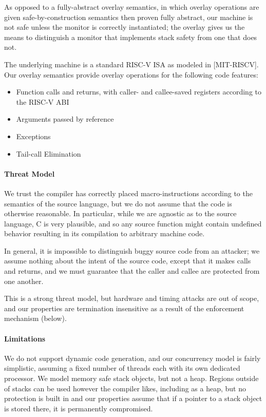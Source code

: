 \documentclass[10pt,conference]{ieeetran}%
\theoremstyle{definition}
\begin{document}
As opposed to a fully-abstract overlay semantics, in which overlay operations
are given safe-by-construction semantics then proven fully abstract,
our machine is not safe unless the monitor is correctly instantiated;
the overlay gives us the means to distinguish a monitor that implements
stack safety from one that does not.

The underlying machine is a standard RISC-V ISA as modeled in [MIT-RISCV].
Our overlay semantics provide overlay operations for the following code features:
\begin{itemize}
\item Function calls and returns, with caller- and callee-saved registers according
  to the RISC-V ABI
\item Arguments passed by reference
\item Exceptions
\item Tail-call Elimination
\end{itemize}

\paragraph*{Threat Model}

We trust the compiler has correctly placed macro-instructions according to
the semantics of the source language, but we do not assume that the code
is otherwise reasonable. In particular, while we are agnostic as to the source
language, C is very plausible, and so any source function might contain undefined
behavior resulting in its compilation to arbitrary machine code.

In general, it is impossible to distinguish buggy source code from an attacker;
we assume nothing about the intent of the source code, except that it makes calls
and returns, and we must guarantee that the caller and callee are protected from one
another.

This is a strong threat model, but hardware and timing attacks are out of scope,
and our properties are termination insensitive as a result of the enforcement mechanism
(below).

\paragraph*{Limitations}

We do not support dynamic code generation, and our concurrency model is fairly
simplistic, assuming a fixed number of threads each with its own dedicated processor.
We model memory safe stack objects, but not a heap. Regions outside of
stacks can be used however the compiler likes, including as a heap, but no protection is
built in and our properties assume that if a pointer to a stack object is stored there,
it is permanently compromised.
\end{document}
